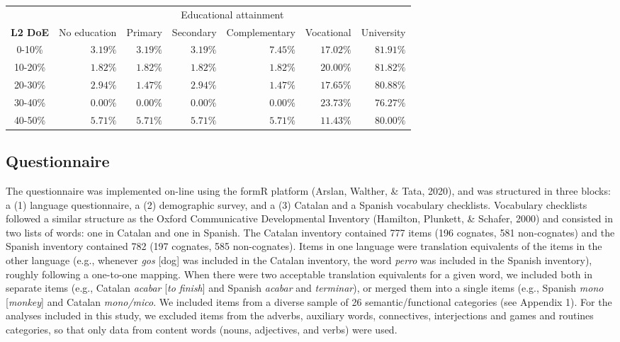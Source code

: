 \documentclass[
  english,
  man,man,floatsintext]{apa6}
\begin{document}
\captionsetup[table]{labelformat=empty,skip=1pt}
\begin{longtable}{crrrrrr}
\toprule
& \multicolumn{6}{c}{Educational attainment} \\ 
 \cmidrule(lr){2-7}
\textbf{L2 DoE} & No education & Primary & Secondary & Complementary & Vocational & University \\ 
\midrule
0-10\% & $3.19\%$ & $3.19\%$ & $3.19\%$ & $7.45\%$ & $17.02\%$ & $81.91\%$ \\ 
10-20\% & $1.82\%$ & $1.82\%$ & $1.82\%$ & $1.82\%$ & $20.00\%$ & $81.82\%$ \\ 
20-30\% & $2.94\%$ & $1.47\%$ & $2.94\%$ & $1.47\%$ & $17.65\%$ & $80.88\%$ \\ 
30-40\% & $0.00\%$ & $0.00\%$ & $0.00\%$ & $0.00\%$ & $23.73\%$ & $76.27\%$ \\ 
40-50\% & $5.71\%$ & $5.71\%$ & $5.71\%$ & $5.71\%$ & $11.43\%$ & $80.00\%$ \\ 
\bottomrule
\end{longtable}

\hypertarget{questionnaire}{%
\subsection{Questionnaire}\label{questionnaire}}

The questionnaire was implemented on-line using the formR platform (Arslan, Walther, \& Tata, 2020), and was structured in three blocks: a (1) language questionnaire, a (2) demographic survey, and a (3) Catalan and a Spanish vocabulary checklists. Vocabulary checklists followed a similar structure as the Oxford Communicative Developmental Inventory (Hamilton, Plunkett, \& Schafer, 2000) and consisted in two lists of words: one in Catalan and one in Spanish. The Catalan inventory contained 777 items (196 cognates, 581 non-cognates) and the Spanish inventory contained 782 (197 cognates, 585 non-cognates). Items in one language were translation equivalents of the items in the other language (e.g., whenever \emph{gos} {[}dog{]} was included in the Catalan inventory, the word \emph{perro} was included in the Spanish inventory), roughly following a one-to-one mapping. When there were two acceptable translation equivalents for a given word, we included both in separate items (e.g., Catalan \emph{acabar} {[}\emph{to finish}{]} and Spanish \emph{acabar} and \emph{terminar}), or merged them into a single items (e.g., Spanish \emph{mono} {[}\emph{monkey}{]} and Catalan \emph{mono/mico}. We included items from a diverse sample of 26 semantic/functional categories (see Appendix 1). For the analyses included in this study, we excluded items from the adverbs, auxiliary words, connectives, interjections and games and routines categories, so that only data from content words (nouns, adjectives, and verbs) were used.
\end{document}
